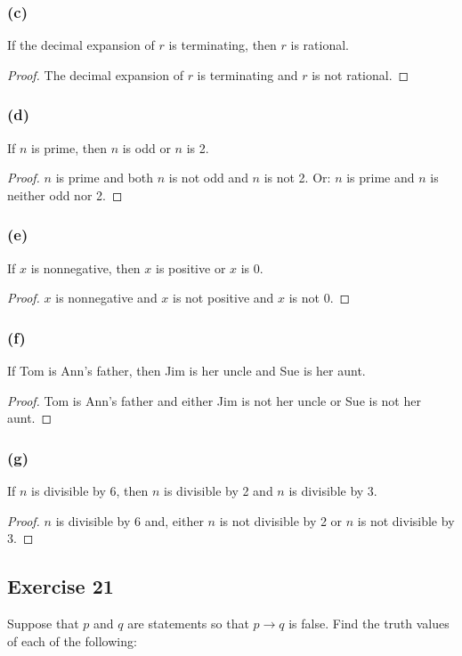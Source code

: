 \documentclass[14pt]{extarticle}
\begin{document}
\subsubsection{(c)} 
If the decimal expansion of $r$ is terminating, then $r$ is rational.

\begin{proof} 
The decimal expansion of $r$ is terminating and $r$ is not rational. 
\end{proof}

\subsubsection{(d)} 
If $n$ is prime, then $n$ is odd or $n$ is 2.

\begin{proof} 
$n$ is prime and both $n$ is not odd and $n$ is not 2. Or: $n$ is prime and $n$ is neither odd nor 2. 
\end{proof}

\subsubsection{(e)} 
If $x$ is nonnegative, then $x$ is positive or $x$ is 0.

\begin{proof} 
$x$ is nonnegative and $x$ is not positive and $x$ is not 0.
\end{proof}

\subsubsection{(f)} 
If Tom is Ann’s father, then Jim is her uncle and Sue is her aunt.

\begin{proof}
Tom is Ann’s father and either Jim is not her uncle or Sue is not her aunt.
\end{proof}

\subsubsection{(g)} 
If $n$ is divisible by 6, then $n$ is divisible by 2 and $n$
is divisible by 3.

\begin{proof} 
$n$ is divisible by 6 and, either $n$ is not divisible by 2 or $n$ is not divisible by 3. 
\end{proof}

\subsection{Exercise 21} 
Suppose that $p$ and $q$ are statements so that $p \to q$ is false. Find the truth values of each of the following:
\end{document}
